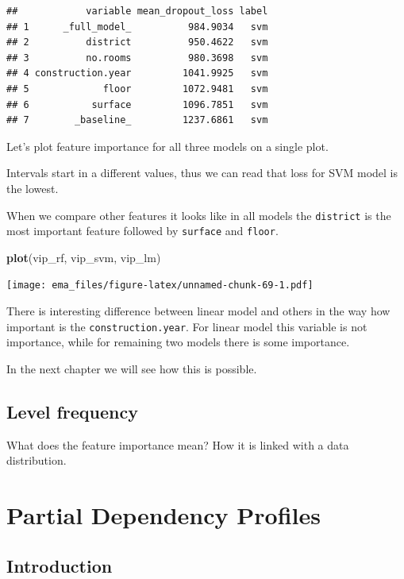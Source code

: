 \documentclass[12pt,]{krantz}
\newenvironment{Shaded}{\begin{snugshade}}{\end{snugshade}}
\newcommand{\KeywordTok}[1]{\textcolor[rgb]{0.13,0.29,0.53}{\textbf{#1}}}
\newcommand{\NormalTok}[1]{#1}
\begin{document}
\begin{verbatim}
##            variable mean_dropout_loss label
## 1      _full_model_          984.9034   svm
## 2          district          950.4622   svm
## 3          no.rooms          980.3698   svm
## 4 construction.year         1041.9925   svm
## 5             floor         1072.9481   svm
## 6           surface         1096.7851   svm
## 7        _baseline_         1237.6861   svm
\end{verbatim}

Let's plot feature importance for all three models on a single plot.

Intervals start in a different values, thus we can read that loss for SVM model is the lowest.

When we compare other features it looks like in all models the \texttt{district} is the most important feature followed by \texttt{surface} and \texttt{floor}.

\begin{Shaded}
\begin{Highlighting}[]
\KeywordTok{plot}\NormalTok{(vip_rf, vip_svm, vip_lm)}
\end{Highlighting}
\end{Shaded}

\texttt{[image: ema\_files/figure-latex/unnamed-chunk-69-1.pdf]}

There is interesting difference between linear model and others in the way how important is the \texttt{construction.year}. For linear model this variable is not importance, while for remaining two models there is some importance.

In the next chapter we will see how this is possible.

\hypertarget{level-frequency}{%
\subsection{Level frequency}\label{level-frequency}}

What does the feature importance mean? How it is linked with a data distribution.

\hypertarget{partialDependenceProfiles}{%
\section{Partial Dependency Profiles}\label{partialDependenceProfiles}}

\hypertarget{PDPIntro}{%
\subsection{Introduction}\label{PDPIntro}}
\end{document}
